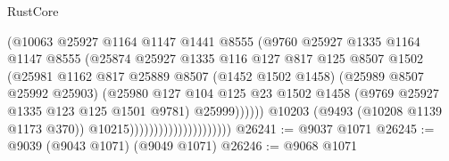 \begin{lexlean}{RustCore}
\begin{coremodule}
                                                (@10063
                                                  @25927
                                                  @1164
                                                  @1147
                                                  @1441
                                                  @8555
                                                  (@9760
                                                    @25927
                                                    @1335
                                                    @1164
                                                    @1147
                                                    @8555
                                                    (@25874
                                                      @25927
                                                      @1335
                                                      @116
                                                      @127
                                                      @817
                                                      @125
                                                      @8507
                                                      @1502
                                                      (@25981
                                                        @1162
                                                        @817
                                                        @25889
                                                        @8507
                                                        (@1452 @1502 @1458)
                                                        (@25989 @8507 @25992 @25903)
                                                        (@25980
                                                          @127
                                                          @104
                                                          @125
                                                          @23
                                                          @1502
                                                          @1458
                                                          (@9769 @25927 @1335 @123 @125 @1501 @9781)
                                                          @25999))))))
                                              @10203
                                              (@9493 (@10208 @1139 @1173 @370))
                                              @10215)))))))))))))))))))))
@26241 := @9037 @1071
@26245 := @9039 (@9043 @1071) (@9049 @1071)
@26246 := @9068 @1071

\end{coremodule}
\end{lexlean}
